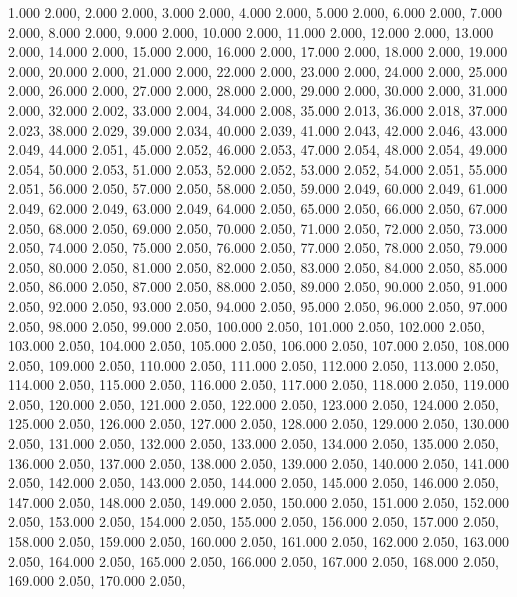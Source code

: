 1.000 2.000, 
2.000 2.000, 
3.000 2.000, 
4.000 2.000, 
5.000 2.000, 
6.000 2.000, 
7.000 2.000, 
8.000 2.000, 
9.000 2.000, 
10.000 2.000, 
11.000 2.000, 
12.000 2.000, 
13.000 2.000, 
14.000 2.000, 
15.000 2.000, 
16.000 2.000, 
17.000 2.000, 
18.000 2.000, 
19.000 2.000, 
20.000 2.000, 
21.000 2.000, 
22.000 2.000, 
23.000 2.000, 
24.000 2.000, 
25.000 2.000, 
26.000 2.000, 
27.000 2.000, 
28.000 2.000, 
29.000 2.000, 
30.000 2.000, 
31.000 2.000, 
32.000 2.002, 
33.000 2.004, 
34.000 2.008, 
35.000 2.013, 
36.000 2.018, 
37.000 2.023, 
38.000 2.029, 
39.000 2.034, 
40.000 2.039, 
41.000 2.043, 
42.000 2.046, 
43.000 2.049, 
44.000 2.051, 
45.000 2.052, 
46.000 2.053, 
47.000 2.054, 
48.000 2.054, 
49.000 2.054, 
50.000 2.053, 
51.000 2.053, 
52.000 2.052, 
53.000 2.052, 
54.000 2.051, 
55.000 2.051, 
56.000 2.050, 
57.000 2.050, 
58.000 2.050, 
59.000 2.049, 
60.000 2.049, 
61.000 2.049, 
62.000 2.049, 
63.000 2.049, 
64.000 2.050, 
65.000 2.050, 
66.000 2.050, 
67.000 2.050, 
68.000 2.050, 
69.000 2.050, 
70.000 2.050, 
71.000 2.050, 
72.000 2.050, 
73.000 2.050, 
74.000 2.050, 
75.000 2.050, 
76.000 2.050, 
77.000 2.050, 
78.000 2.050, 
79.000 2.050, 
80.000 2.050, 
81.000 2.050, 
82.000 2.050, 
83.000 2.050, 
84.000 2.050, 
85.000 2.050, 
86.000 2.050, 
87.000 2.050, 
88.000 2.050, 
89.000 2.050, 
90.000 2.050, 
91.000 2.050, 
92.000 2.050, 
93.000 2.050, 
94.000 2.050, 
95.000 2.050, 
96.000 2.050, 
97.000 2.050, 
98.000 2.050, 
99.000 2.050, 
100.000 2.050, 
101.000 2.050, 
102.000 2.050, 
103.000 2.050, 
104.000 2.050, 
105.000 2.050, 
106.000 2.050, 
107.000 2.050, 
108.000 2.050, 
109.000 2.050, 
110.000 2.050, 
111.000 2.050, 
112.000 2.050, 
113.000 2.050, 
114.000 2.050, 
115.000 2.050, 
116.000 2.050, 
117.000 2.050, 
118.000 2.050, 
119.000 2.050, 
120.000 2.050, 
121.000 2.050, 
122.000 2.050, 
123.000 2.050, 
124.000 2.050, 
125.000 2.050, 
126.000 2.050, 
127.000 2.050, 
128.000 2.050, 
129.000 2.050, 
130.000 2.050, 
131.000 2.050, 
132.000 2.050, 
133.000 2.050, 
134.000 2.050, 
135.000 2.050, 
136.000 2.050, 
137.000 2.050, 
138.000 2.050, 
139.000 2.050, 
140.000 2.050, 
141.000 2.050, 
142.000 2.050, 
143.000 2.050, 
144.000 2.050, 
145.000 2.050, 
146.000 2.050, 
147.000 2.050, 
148.000 2.050, 
149.000 2.050, 
150.000 2.050, 
151.000 2.050, 
152.000 2.050, 
153.000 2.050, 
154.000 2.050, 
155.000 2.050, 
156.000 2.050, 
157.000 2.050, 
158.000 2.050, 
159.000 2.050, 
160.000 2.050, 
161.000 2.050, 
162.000 2.050, 
163.000 2.050, 
164.000 2.050, 
165.000 2.050, 
166.000 2.050, 
167.000 2.050, 
168.000 2.050, 
169.000 2.050, 
170.000 2.050, 
